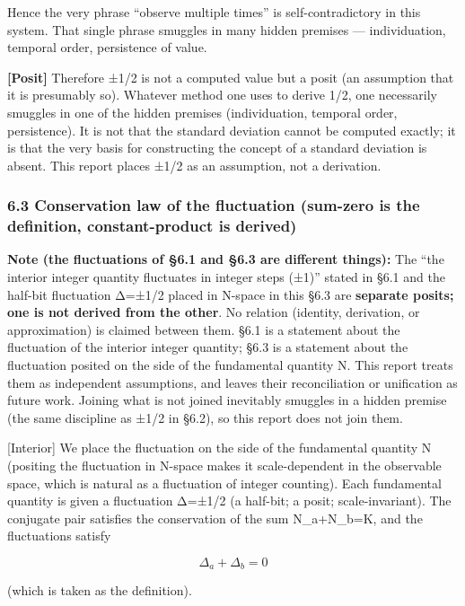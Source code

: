 \documentclass[11pt]{ltjsarticle}
\begin{document}
Hence the very phrase ``observe multiple times'' is self-contradictory
in this system. That single phrase smuggles in many hidden premises ---
individuation, temporal order, persistence of value.

\textbf{{[}Posit{]}} Therefore ±1/2 is not a computed value but a posit
(an assumption that it is presumably so). Whatever method one uses to
derive 1/2, one necessarily smuggles in one of the hidden premises
(individuation, temporal order, persistence). It is not that the
standard deviation cannot be computed exactly; it is that the very basis
for constructing the concept of a standard deviation is absent. This
report places ±1/2 as an assumption, not a derivation.

\subsubsection{6.3 Conservation law of the fluctuation (sum-zero is the
definition, constant-product is
derived)}\label{conservation-law-of-the-fluctuation-sum-zero-is-the-definition-constant-product-is-derived}

\textbf{Note (the fluctuations of §6.1 and §6.3 are different things):}
The ``the interior integer quantity fluctuates in integer steps (±1)''
stated in §6.1 and the half-bit fluctuation Δ=±1/2 placed in N-space in
this §6.3 are \textbf{separate posits; one is not derived from the
other}. No relation (identity, derivation, or approximation) is claimed
between them. §6.1 is a statement about the fluctuation of the interior
integer quantity; §6.3 is a statement about the fluctuation posited on
the side of the fundamental quantity N. This report treats them as
independent assumptions, and leaves their reconciliation or unification
as future work. Joining what is not joined inevitably smuggles in a
hidden premise (the same discipline as ±1/2 in §6.2), so this report
does not join them.

{[}Interior{]} We place the fluctuation on the side of the fundamental
quantity N (positing the fluctuation in N-space makes it scale-dependent
in the observable space, which is natural as a fluctuation of integer
counting). Each fundamental quantity is given a fluctuation Δ=±1/2 (a
half-bit; a posit; scale-invariant). The conjugate pair satisfies the
conservation of the sum N\_a+N\_b=K, and the fluctuations satisfy

\[\boxed{\ \Delta_a + \Delta_b = 0\ }\]

(which is taken as the definition).
\end{document}

